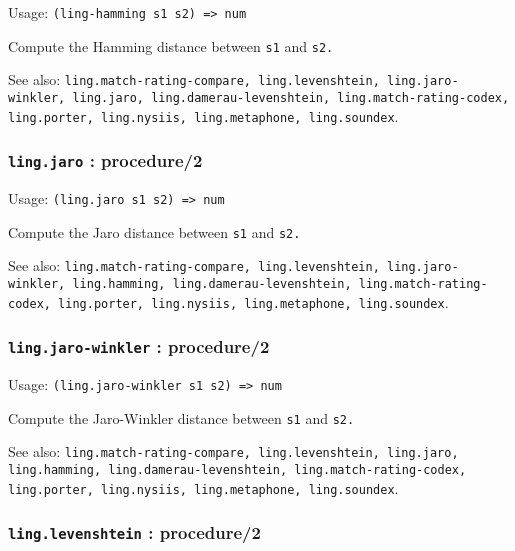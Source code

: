 \documentclass[
]{article}
\newcommand{\passthrough}[1]{#1}
\begin{document}
Usage: \passthrough{\lstinline!(ling-hamming s1 s2) => num!}

Compute the Hamming distance between \passthrough{\lstinline!s1!} and
\passthrough{\lstinline!s2.!}

See also:
\passthrough{\lstinline!ling.match-rating-compare, ling.levenshtein, ling.jaro-winkler, ling.jaro, ling.damerau-levenshtein, ling.match-rating-codex, ling.porter, ling.nysiis, ling.metaphone, ling.soundex!}.

\hypertarget{ling.jaro-procedure2}{%
\subsubsection{\texorpdfstring{\texttt{ling.jaro} :
procedure/2}{ling.jaro : procedure/2}}\label{ling.jaro-procedure2}}

Usage: \passthrough{\lstinline!(ling.jaro s1 s2) => num!}

Compute the Jaro distance between \passthrough{\lstinline!s1!} and
\passthrough{\lstinline!s2.!}

See also:
\passthrough{\lstinline!ling.match-rating-compare, ling.levenshtein, ling.jaro-winkler, ling.hamming, ling.damerau-levenshtein, ling.match-rating-codex, ling.porter, ling.nysiis, ling.metaphone, ling.soundex!}.

\hypertarget{ling.jaro-winkler-procedure2}{%
\subsubsection{\texorpdfstring{\texttt{ling.jaro-winkler} :
procedure/2}{ling.jaro-winkler : procedure/2}}\label{ling.jaro-winkler-procedure2}}

Usage: \passthrough{\lstinline!(ling.jaro-winkler s1 s2) => num!}

Compute the Jaro-Winkler distance between \passthrough{\lstinline!s1!}
and \passthrough{\lstinline!s2.!}

See also:
\passthrough{\lstinline!ling.match-rating-compare, ling.levenshtein, ling.jaro, ling.hamming, ling.damerau-levenshtein, ling.match-rating-codex, ling.porter, ling.nysiis, ling.metaphone, ling.soundex!}.

\hypertarget{ling.levenshtein-procedure2}{%
\subsubsection{\texorpdfstring{\texttt{ling.levenshtein} :
procedure/2}{ling.levenshtein : procedure/2}}\label{ling.levenshtein-procedure2}}
\end{document}
